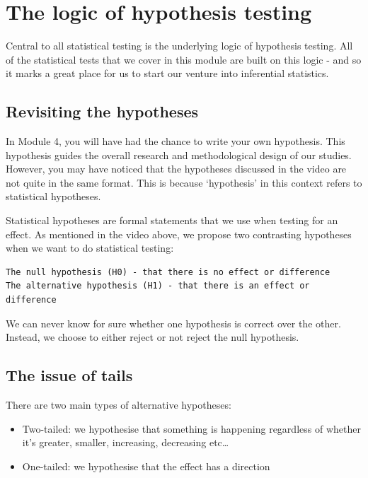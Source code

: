 \documentclass[
]{book}
\providecommand{\tightlist}{%
  \setlength{\itemsep}{0pt}\setlength{\parskip}{0pt}}
\begin{document}
\section{The logic of hypothesis testing}\label{the-logic-of-hypothesis-testing}

Central to all statistical testing is the underlying logic of hypothesis testing. All of the statistical tests that we cover in this module are built on this logic - and so it marks a great place for us to start our venture into inferential statistics.

\subsection{Revisiting the hypotheses}\label{revisiting-the-hypotheses}

In Module 4, you will have had the chance to write your own hypothesis. This hypothesis guides the overall research and methodological design of our studies. However, you may have noticed that the hypotheses discussed in the video are not quite in the same format. This is because `hypothesis' in this context refers to statistical hypotheses.

Statistical hypotheses are formal statements that we use when testing for an effect. As mentioned in the video above, we propose two contrasting hypotheses when we want to do statistical testing:

\begin{verbatim}
The null hypothesis (H0) - that there is no effect or difference
The alternative hypothesis (H1) - that there is an effect or difference
\end{verbatim}

We can never know for sure whether one hypothesis is correct over the other. Instead, we choose to either reject or not reject the null hypothesis.

\subsection{The issue of tails}\label{the-issue-of-tails}

There are two main types of alternative hypotheses:

\begin{itemize}
\tightlist
\item
  Two-tailed: we hypothesise that something is happening regardless of whether it's greater, smaller, increasing, decreasing etc\ldots{}
\item
  One-tailed: we hypothesise that the effect has a direction
\end{itemize}
\end{document}
